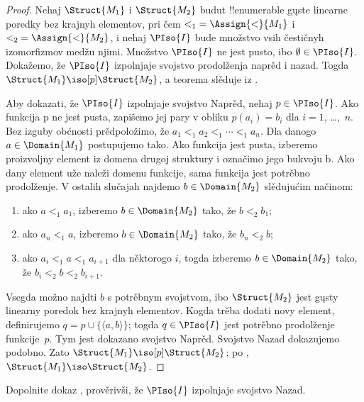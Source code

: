 \documentclass[../../../include/open-logic-section]{subfiles}
\begin{document}
\begin{proof}
  Nehaj $\Struct{M_1}$ i $\Struct{M_2}$ budut !!{enumerable} gųste
  linearne poredky bez krajnyh elementov, pri čem ${<_1} =
  \Assign{<}{M_1}$ i ${<_2} = \Assign{<}{M_2}$, i nehaj $\PIso{I}$
  bude množstvo vsih čestičnyh izomorfizmov medžu njimi. Množstvo
  $\PIso{I}$ ne jest pusto, ibo $\emptyset \in \PIso{I}$. Dokažemo,
  že $\PIso{I}$ izpolnjaje svojstvo prodolženja naprěd i nazad. Togda
  $\Struct{M_1} \iso[p] \Struct{M_2}$, a teorema slěduje iz
  .

  Aby dokazati, že $\PIso{I}$ izpolnjaje svojstvo Naprěd, nehaj $p \in
  \PIso{I}$. Ako funkcija p ne jest pusta, zapišemo jej pary v obliku
  $p(a_i) = b_i$ dla $i = 1$, \dots,~$n$. Bez izguby obćnosti
  prědpoložimo, že $a_1 <_1 a_2 <_1 \cdots <_1 a_n$. Dla danogo
  $a \in \Domain{M_1}$ postupujemo tako. Ako funkcija jest pusta,
  izberemo proizvoljny element iz domena drugoj struktury i označimo
  jego bukvoju b. Ako dany element uže naleži domenu funkcije, sama
  funkcija jest potrěbno prodolženje. V ostalih slučajah najdemo
  $b \in \Domain{M_2}$ slědujućim načinom:
  \begin{enumerate}
  \item ako $a <_1 a_1$, izberemo $b \in \Domain{M_2}$ tako, že
    $b <_2 b_1$;
  \item ako $a_n <_1 a$, izberemo $b \in \Domain{M_2}$ tako, že
    $b_n <_2 b$;
 \item ako $a_i <_1 a <_1 a_{i+1}$ dla něktorogo $i$, togda izberemo
   $b \in \Domain{M_2}$ tako, že $b_i <_2 b <_2 b_{i+1}$.
  \end{enumerate}
  Vsegda možno najdti $b$ s potrěbnym svojstvom, ibo $\Struct{M_2}$
  jest gųsty linearny poredok bez krajnyh elementov. Kogda trěba dodati
  novy element, definirujemo $q = p \cup \{ \langle a, b \rangle \}$;
  togda $q \in \PIso{I}$ jest potrěbno prodolženje funkcije~$p$. Tym
  jest dokazano svojstvo Naprěd.
  Svojstvo Nazad dokazujemo podobno. Zato $\Struct{M_1} \iso[p]
  \Struct{M_2}$; po , $\Struct{M_1} \iso
  \Struct{M_2}$.
\end{proof}

\begin{prob}
  Dopolnite dokaz , prověrivši, že
  $\PIso{I}$ izpolnjaje svojstvo Nazad.
\end{prob}
\end{document}
